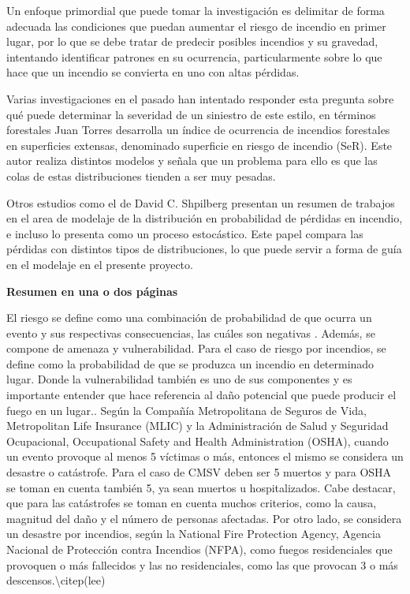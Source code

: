 \documentclass[
  oneside]{memoir}
\begin{document}
Un enfoque primordial que puede tomar la investigación es delimitar de
forma adecuada las condiciones que puedan aumentar el riesgo de incendio
en primer lugar, por lo que se debe tratar de predecir posibles
incendios y su gravedad, intentando identificar patrones en su
ocurrencia, particularmente sobre lo que hace que un incendio se
convierta en uno con altas pérdidas.

Varias investigaciones en el pasado han intentado responder esta
pregunta sobre qué puede determinar la severidad de un siniestro de este
estilo, en términos forestales Juan Torres \citep{rojo} desarrolla un
índice de ocurrencia de incendios forestales en superficies extensas,
denominado superficie en riesgo de incendio (SeR). Este autor realiza
distintos modelos y señala que un problema para ello es que las colas de
estas distribuciones tienden a ser muy pesadas.

Otros estudios como el de David C. Shpilberg \citep{shpilberg} presentan
un resumen de trabajos en el area de modelaje de la distribución en
probabilidad de pérdidas en incendio, e incluso lo presenta como un
proceso estocástico. Este papel compara las pérdidas con distintos tipos
de distribuciones, lo que puede servir a forma de guía en el modelaje en
el presente proyecto.

\textbf{Resumen en una o dos páginas}

El riesgo se define como una combinación de probabilidad de que ocurra
un evento y sus respectivas consecuencias, las cuáles son negativas
\citep{ciifen}. Además, se compone de amenaza y vulnerabilidad. Para el
caso de riesgo por incendios, se define como la probabilidad de que se
produzca un incendio en determinado lugar. Donde la vulnerabilidad
también es uno de sus componentes y es importante entender que hace
referencia al daño potencial que puede producir el fuego en un
lugar.\citep{cartografia}. Según la Compañía Metropolitana de Seguros de
Vida, Metropolitan Life Insurance (MLIC) y la Administración de Salud y
Seguridad Ocupacional, Occupational Safety and Health Administration
(OSHA), cuando un evento provoque al menos 5 víctimas o más, entonces el
mismo se considera un desastre o catástrofe. Para el caso de CMSV deben
ser 5 muertos y para OSHA se toman en cuenta también 5, ya sean muertos
u hospitalizados. Cabe destacar, que para las catástrofes se toman en
cuenta muchos criterios, como la causa, magnitud del daño y el número de
personas afectadas. Por otro lado, se considera un desastre por
incendios, según la National Fire Protection Agency, Agencia Nacional de
Protección contra Incendios (NFPA), como fuegos residenciales que
provoquen o más fallecidos y las no residenciales, como las que provocan
3 o más descensos.\textbackslash citep(lee)
\end{document}
